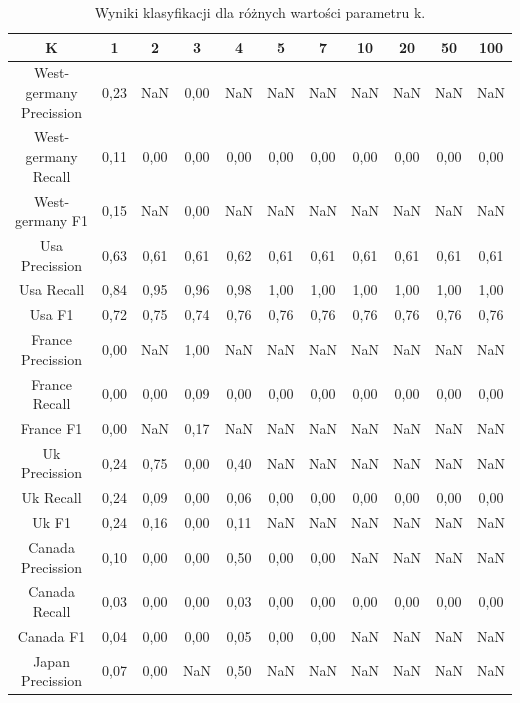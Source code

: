 \documentclass{classrep}
\begin{document}
\newpage
\begin{table}[h!]
\caption{Wyniki klasyfikacji dla różnych wartości parametru k.}
\centering
\vspace{0.1cm}
 \begin{tabular}{c c c c c c c c c c c}

    \textbf{K} & \textbf{1}   & \textbf{2}  & \textbf{3}  & \textbf{4}  & \textbf{5} & \textbf{7}   & \textbf{10}  & \textbf{20}  & \textbf{50}  & \textbf{100} \\

\hline
West-germany Precission 	& 0,23 & NaN & 0,00 & NaN  & NaN & NaN  & NaN & NaN & NaN  & NaN\\
West-germany Recall 		& 0,11 & 0,00 & 0,00 & 0,00 & 0,00 & 0,00 & 0,00 & 0,00 & 0,00 & 0,00\\
West-germany F1		& 0,15 & NaN & 0,00 & NaN  & NaN & NaN  & NaN & NaN & NaN  & NaN \\
\hline
Usa Precission 			& 0,63 & 0,61 & 0,61 & 0,62 & 0,61 & 0,61 & 0,61 & 0,61 & 0,61 & 0,61 \\
Usa Recall				& 0,84 & 0,95 & 0,96 & 0,98 & 1,00 & 1,00 & 1,00 & 1,00 & 1,00 & 1,00 \\
Usa F1			 	& 0,72 & 0,75 & 0,74 & 0,76 & 0,76 & 0,76 & 0,76 & 0,76 & 0,76 & 0,76 \\
\hline
France Precission 		& 0,00 & NaN & 1,00 & NaN  & NaN  & NaN & NaN & NaN  & NaN & NaN \\
France Recall 			& 0,00 & 0,00 & 0,09 & 0,00 & 0,00 & 0,00 & 0,00 & 0,00 & 0,00 & 0,00 \\
France F1 				& 0,00 & NaN & 0,17 & NaN  & NaN  & NaN & NaN & NaN  & NaN & NaN\\
\hline
Uk Precission 			& 0,24 & 0,75 & 0,00 & 0,40 & NaN  & NaN & NaN & NaN  & NaN & NaN\\
Uk Recall 				& 0,24 & 0,09 & 0,00 & 0,06 & 0,00 & 0,00 & 0,00 & 0,00 & 0,00 & 0,00\\
Uk F1 				& 0,24 & 0,16 & 0,00 & 0,11 & NaN  & NaN & NaN & NaN  & NaN & NaN \\
\hline
Canada Precission		& 0,10 & 0,00 & 0,00 & 0,50 & 0,00 & 0,00 & NaN & NaN  & NaN & NaN\\
Canada Recall 			& 0,03 & 0,00 & 0,00 & 0,03 & 0,00 & 0,00 & 0,00 & 0,00 & 0,00 & 0,00 \\
Canada F1 			& 0,04 & 0,00 & 0,00 & 0,05 & 0,00 & 0,00 & NaN &NaN  & NaN & NaN \\
\hline
Japan Precission 		& 0,07 & 0,00 & NaN & 0,50 & NaN  & NaN & NaN & NaN & NaN & NaN \\

\end{tabular}
\end{table}
\end{document}
